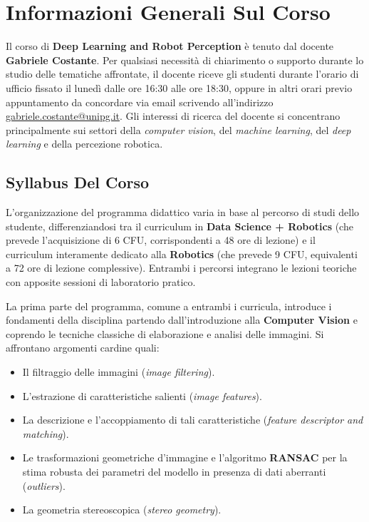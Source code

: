 ﻿\documentclass[11pt, a4paper]{article}
\author{Francesco Lo Verde}
\begin{document}
\section{Informazioni Generali Sul Corso}

Il corso di \textbf{Deep Learning and Robot Perception} è tenuto dal docente \textbf{Gabriele Costante}. Per qualsiasi necessità di chiarimento o supporto durante lo studio delle tematiche affrontate, il docente riceve gli studenti durante l'orario di ufficio fissato il lunedì dalle ore 16:30 alle ore 18:30, oppure in altri orari previo appuntamento da concordare via email scrivendo all'indirizzo \href{mailto:gabriele.costante@unipg.it}{gabriele.costante@unipg.it}. Gli interessi di ricerca del docente si concentrano principalmente sui settori della \emph{computer vision}, del \emph{machine learning}, del \emph{deep learning} e della percezione robotica.


\newpage

\subsection{Syllabus Del Corso}

L'organizzazione del programma didattico varia in base al percorso di studi dello studente, differenziandosi tra il curriculum in \textbf{Data Science + Robotics} (che prevede l'acquisizione di 6 CFU, corrispondenti a 48 ore di lezione) e il curriculum interamente dedicato alla \textbf{Robotics} (che prevede 9 CFU, equivalenti a 72 ore di lezione complessive). Entrambi i percorsi integrano le lezioni teoriche con apposite sessioni di laboratorio pratico.

La prima parte del programma, comune a entrambi i curricula, introduce i fondamenti della disciplina partendo dall'introduzione alla \textbf{Computer Vision} e coprendo le tecniche classiche di elaborazione e analisi delle immagini. Si affrontano argomenti cardine quali:
\begin{itemize}[noitemsep]
    \item Il filtraggio delle immagini (\emph{image filtering}).
    \item L'estrazione di caratteristiche salienti (\emph{image features}).
    \item La descrizione e l'accoppiamento di tali caratteristiche (\emph{feature descriptor and matching}).
    \item Le trasformazioni geometriche d'immagine e l'algoritmo \textbf{RANSAC} per la stima robusta dei parametri del modello in presenza di dati aberranti (\emph{outliers}).
    \item La geometria stereoscopica (\emph{stereo geometry}).
\end{itemize}
\end{document}
